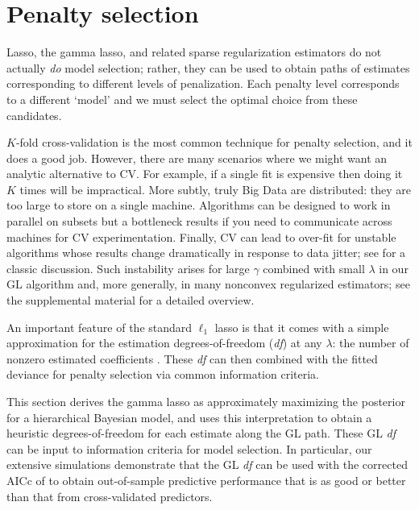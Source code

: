 \documentclass[12pt]{article}
\begin{document}
\section{Penalty selection}
\label{sec:select}

Lasso, the gamma lasso, and related 
sparse regularization estimators do not actually {\it do} model selection; rather, they
can be used to obtain paths of estimates corresponding to different levels of
penalization.  Each penalty level corresponds to a different `model'
and we must select the optimal choice from these candidates.

$K$-fold cross-validation \cite[CV; e.g.,][]{efron_estimation_2004} 
is the most common technique for penalty selection, and it does a good job.  However, there are many scenarios where
we might want an analytic alternative to CV.  For example, if a single fit is expensive then doing it $K$
times will be impractical.  More subtly, truly Big Data are distributed: they
are too large to store on a single machine. Algorithms can be designed to work
in parallel on subsets
\citep[e.g.,][]{taddy_distributed_2015} but a bottleneck
results if you need to communicate across machines for CV experimentation.
Finally, CV can lead to over-fit for unstable algorithms whose
results change dramatically in response to data jitter; see
\cite{breiman_heuristics_1996} for a classic discussion.  Such instability
arises for large $\gamma$ combined with small $\lambda$ in our GL algorithm
and, more generally, in many nonconvex regularized estimators; see the
supplemental material for a detailed overview.

An important feature of the standard $\ell_1$ lasso is that it comes with a
simple approximation for the estimation degrees-of-freedom (\textit{df}) at
any $\lambda$: the number of nonzero estimated coefficients
\citep[see][]{zou_degrees_2007}.  These \textit{df} can then combined with the fitted
deviance for penalty selection via common information criteria.

This section derives the gamma lasso as approximately maximizing the posterior
for a hierarchical Bayesian model, and uses this
interpretation to obtain a heuristic degrees-of-freedom for each estimate
along the GL path.  These GL \textit{df} can  be input to information criteria
for model selection. In particular, our extensive simulations demonstrate that the GL
\textit{df} can be used with  the corrected AICc of
\citet{hurvich_regression_1989}  to obtain out-of-sample predictive
performance that is as good or better than that from cross-validated
predictors.
\end{document}
